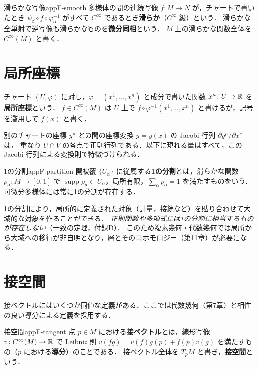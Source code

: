 \begin{mydef}{滑らかな写像}{appF-smooth}
多様体の間の連続写像 $f\colon M\to N$ が，チャートで書いたとき $\psi_\beta\circ f\circ\varphi_\alpha^{-1}$ がすべて $C^\infty$ であるとき\textbf{滑らか}（$C^\infty$ 級）という．
滑らかな全単射で逆写像も滑らかなものを\textbf{微分同相}という．
$M$ 上の滑らかな関数全体を $C^\infty(M)$ と書く．
\end{mydef}

\section{局所座標}

チャート $(U,\varphi)$ に対し，$\varphi=(x^1,\dots,x^n)$ と成分で書いた関数 $x^\mu\colon U\to\mathbb{R}$ を\textbf{局所座標}という．
$f\in C^\infty(M)$ は $U$ 上で $f\circ\varphi^{-1}(x^1,\dots,x^n)$ と書けるが，記号を濫用して $f(x)$ と書く．

別のチャートの座標 $y^\mu$ との間の座標変換 $y=y(x)$ の Jacobi 行列 $\partial y^\mu/\partial x^\nu$ は，
重なり $U\cap V$ の各点で正則行列である．以下に現れる量はすべて，この Jacobi 行列による変換則で特徴づけられる．

\begin{mydef}{1の分割}{appF-partition}
開被覆 $\{U_\alpha\}$ に従属する\textbf{1の分割}とは，滑らかな関数 $\rho_\alpha\colon M\to[0,1]$ で
$\operatorname{supp}\rho_\alpha\subset U_\alpha$，局所有限，$\sum_\alpha\rho_\alpha=1$ を満たすものをいう．
可微分多様体には常に1の分割が存在する．
\end{mydef}

1の分割により，局所的に定義された対象（計量，接続など）を貼り合わせて大域的な対象を作ることができる．
\emph{正則関数や多項式には1の分割に相当するものが存在しない}（一致の定理，付録D）．
このため複素幾何・代数幾何では局所から大域への移行が非自明となり，層とそのコホモロジー（第11章）が必要になる．

\section{接空間}

接ベクトルにはいくつか同値な定義がある．ここでは代数幾何（第7章）と相性の良い導分による定義を採用する．

\begin{mydef}{接空間}{appF-tangent}
点 $p\in M$ における\textbf{接ベクトル}とは，線形写像 $v\colon C^\infty(M)\to\mathbb{R}$ で
Leibniz 則 $v(fg)=v(f)g(p)+f(p)v(g)$ を満たすもの（$p$ における\textbf{導分}）のことである．
接ベクトル全体を $T_pM$ と書き，\textbf{接空間}という．
\end{mydef}

